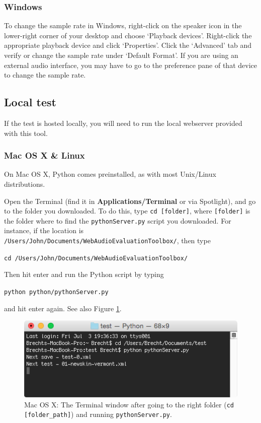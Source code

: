\documentclass[11pt, oneside]{article}   	%
\begin{document}
		\subsubsection{Windows}
			To change the sample rate in Windows, right-click on the speaker icon in the lower-right corner of your desktop and choose `Playback devices'. Right-click the appropriate playback device and click `Properties'. Click the `Advanced' tab and verify or change the sample rate under `Default Format'.    %
			If you are using an external audio interface, you may have to go to the preference pane of that device to change the sample rate.

	\subsection{Local test}
		If the test is hosted locally, you will need to run the local webserver provided with this tool. 
		
		\subsubsection{Mac OS X \& Linux}

			On Mac OS X, Python comes preinstalled, as with most Unix/Linux distributions.

			Open the Terminal (find it in \textbf{Applications/Terminal} or via Spotlight), and go to the folder you downloaded. To do this, type \texttt{cd [folder]}, where \texttt{[folder]} is the folder where to find the \texttt{pythonServer.py} script you downloaded. For instance, if the location is \texttt{/Users/John/Documents/WebAudioEvaluationToolbox/}, then type
			
				\texttt{cd /Users/John/Documents/WebAudioEvaluationToolbox/}
				
			Then hit enter and run the Python script by typing

				\texttt{python python/pythonServer.py}

			and hit enter again. See also Figure \ref{fig:terminal}.
			
			\begin{figure}[htbp]
	                \begin{center}
	                \includegraphics[width=.75\textwidth]{pythonServer.png}
	                \caption{Mac OS X: The Terminal window after going to the right folder (\texttt{cd [folder\_path]}) and running \texttt{pythonServer.py}.}
	                \label{fig:terminal}
	                \end{center}
	                \end{figure}
\end{document}
